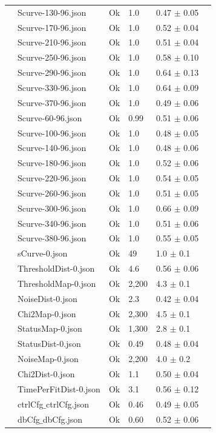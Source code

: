 {\begin{longtable}{|llllll|}
 & Scurve-130-96.json & Ok & 1.0 & 0.47 $\pm$ 0.05 & \\
 & Scurve-170-96.json & Ok & 1.0 & 0.52 $\pm$ 0.04 & \\
 & Scurve-210-96.json & Ok & 1.0 & 0.51 $\pm$ 0.04 & \\
 & Scurve-250-96.json & Ok & 1.0 & 0.58 $\pm$ 0.10 & \\
 & Scurve-290-96.json & Ok & 1.0 & 0.64 $\pm$ 0.13 & \\
 & Scurve-330-96.json & Ok & 1.0 & 0.64 $\pm$ 0.09 & \\
 & Scurve-370-96.json & Ok & 1.0 & 0.49 $\pm$ 0.06 & \\
 & Scurve-60-96.json & Ok & 0.99 & 0.51 $\pm$ 0.06 & \\
 & Scurve-100-96.json & Ok & 1.0 & 0.48 $\pm$ 0.05 & \\
 & Scurve-140-96.json & Ok & 1.0 & 0.48 $\pm$ 0.06 & \\
 & Scurve-180-96.json & Ok & 1.0 & 0.52 $\pm$ 0.06 & \\
 & Scurve-220-96.json & Ok & 1.0 & 0.54 $\pm$ 0.05 & \\
 & Scurve-260-96.json & Ok & 1.0 & 0.51 $\pm$ 0.05 & \\
 & Scurve-300-96.json & Ok & 1.0 & 0.66 $\pm$ 0.09 & \\
 & Scurve-340-96.json & Ok & 1.0 & 0.51 $\pm$ 0.06 & \\
 & Scurve-380-96.json & Ok & 1.0 & 0.55 $\pm$ 0.05 & \\
 & sCurve-0.json & Ok & 49 & 1.0 $\pm$ 0.1 & \\
 & ThresholdDist-0.json & Ok & 4.6 & 0.56 $\pm$ 0.06 & \\
 & ThresholdMap-0.json & Ok & 2,200 & 4.3 $\pm$ 0.1 & \\
 & NoiseDist-0.json & Ok & 2.3 & 0.42 $\pm$ 0.04 & \\
 & Chi2Map-0.json & Ok & 2,300 & 4.5 $\pm$ 0.1 & \\
 & StatusMap-0.json & Ok & 1,300 & 2.8 $\pm$ 0.1 & \\
 & StatusDist-0.json & Ok & 0.49 & 0.48 $\pm$ 0.04 & \\
 & NoiseMap-0.json & Ok & 2,200 & 4.0 $\pm$ 0.2 & \\
 & Chi2Dist-0.json & Ok & 1.1 & 0.50 $\pm$ 0.04 & \\
 & TimePerFitDist-0.json & Ok & 3.1 & 0.56 $\pm$ 0.12 & \\
 & ctrlCfg$\_$ctrlCfg.json & Ok & 0.46 & 0.49 $\pm$ 0.05 & \\
 & dbCfg$\_$dbCfg.json & Ok & 0.60 & 0.52 $\pm$ 0.06 & \\

\end{longtable}}

